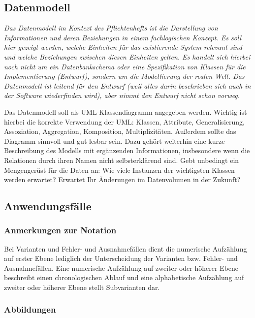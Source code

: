 \documentclass[fontsize=12pt,paper=a4,twoside]{scrartcl}
\begin{document}
\subsection{Datenmodell}
  {\em Das Datenmodell im Kontext des Pflichtenhefts ist {\glqq}die
  Darstellung von Informationen und deren Beziehungen in einem
  fachlogischen Konzept{\grqq}. Es soll hier gezeigt werden, welche
  Einheiten für das existierende System relevant sind und welche
  Beziehungen zwischen diesen Einheiten gelten. Es handelt sich
  hierbei noch nicht um ein Datenbankschema oder eine Spezifikation
  von Klassen für die Implementierung (Entwurf), sondern um die
  Modellierung der realen Welt. Das Datenmodell ist leitend für den
  Entwurf (weil alles darin beschrieben sich auch in der Software 
  wiederfinden wird), aber nimmt den Entwurf nicht schon vorweg.
  
  Das Datenmodell soll als UML-Klassendiagramm angegeben werden.
  Wichtig ist hierbei die korrekte Verwendung der UML: Klassen,
  Attribute, Generalisierung, Assoziation, Aggregation, Komposition,
  Multiplizitäten. Außerdem sollte das Diagramm sinnvoll und gut
  lesbar sein. Dazu gehört weiterhin eine kurze Beschreibung des
  Modells mit ergänzenden Informationen, insbesondere wenn die
  Relationen durch ihren Namen nicht selbsterklärend sind. Gebt
  unbedingt ein Mengengerüst für die Daten an: Wie viele Instanzen der
  wichtigsten Klassen werden erwartet? Erwartet Ihr Änderungen im
  Datenvolumen in der Zukunft?}


\subsection{Anwendungsfälle}

\subsubsection{Anmerkungen zur Notation}
Bei Varianten und Fehler- und Ausnahmefällen dient die numerische Aufzählung auf erster Ebene lediglich der Unterscheidung der Varianten bzw. Fehler- und Ausnahmefällen. Eine numerische Aufzählung auf zweiter oder höherer Ebene beschreibt einen chronologischen Ablauf und eine alphabetische Aufzählung auf zweiter oder höherer Ebene stellt Subvarianten dar.
  
\subsubsection{Abbildungen}
\end{document}
